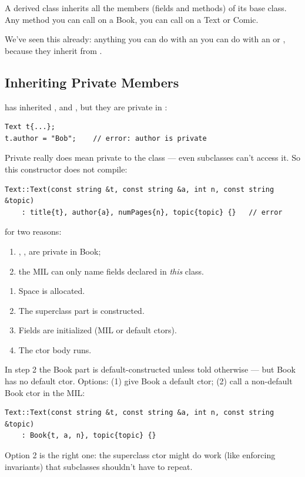 A derived class inherits all the members (fields and methods) of its base
class. Any method you can call on a Book, you can call on a Text or Comic.

\begin{aside}
We've seen this already: anything you can do with an  you can do
with an  or , because they inherit from
.
\end{aside}

\subsection{Inheriting Private Members}
 has inherited ,  and , but
they are private in :
\begin{lstlisting}[style=cpp]
Text t{...};
t.author = "Bob";    // error: author is private
\end{lstlisting}
Private really does mean private to the class --- even subclasses can't access
it. So this constructor does not compile:
\begin{lstlisting}[style=cpp]
Text::Text(const string &t, const string &a, int n, const string &topic)
    : title{t}, author{a}, numPages{n}, topic{topic} {}   // error
\end{lstlisting}
for two reasons:
\begin{enumerate}
  \item {}, ,  are private in Book;
  \item the MIL can only name fields declared in \emph{this} class.
\end{enumerate}

\begin{important}
\begin{enumerate}
  \item Space is allocated.
  \item The superclass part is constructed.
  \item Fields are initialized (MIL or default ctors).
  \item The ctor body runs.
\end{enumerate}
\end{important}
In step 2 the Book part is default-constructed unless told otherwise --- but Book
has no default ctor. Options: (1) give Book a default ctor; (2) call a
non-default Book ctor in the MIL:
\begin{lstlisting}[style=cpp]
Text::Text(const string &t, const string &a, int n, const string &topic)
    : Book{t, a, n}, topic{topic} {}
\end{lstlisting}
Option 2 is the right one: the superclass ctor might do work (like enforcing
invariants) that subclasses shouldn't have to repeat.

